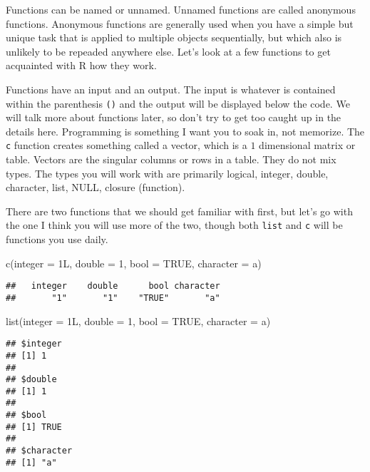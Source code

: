 \documentclass[
]{book}
\newenvironment{Shaded}{\begin{snugshade}}{\end{snugshade}}
\newcommand{\AttributeTok}[1]{\textcolor[rgb]{0.77,0.63,0.00}{#1}}
\newcommand{\ConstantTok}[1]{\textcolor[rgb]{0.00,0.00,0.00}{#1}}
\newcommand{\DecValTok}[1]{\textcolor[rgb]{0.00,0.00,0.81}{#1}}
\newcommand{\FunctionTok}[1]{\textcolor[rgb]{0.00,0.00,0.00}{#1}}
\newcommand{\NormalTok}[1]{#1}
\newcommand{\StringTok}[1]{\textcolor[rgb]{0.31,0.60,0.02}{#1}}
\begin{document}
Functions can be named or unnamed. Unnamed functions are called anonymous functions. Anonymous functions are generally used when you have a simple but unique task that is applied to multiple objects sequentially, but which also is unlikely to be repeaded anywhere else. Let's look at a few functions to get acquainted with R how they work.

Functions have an input and an output. The input is whatever is contained within the parenthesis \texttt{()} and the output will be displayed below the code. We will talk more about functions later, so don't try to get too caught up in the details here. Programming is something I want you to soak in, not memorize. The \texttt{c} function creates something called a vector, which is a \(1\) dimensional matrix or table. Vectors are the singular columns or rows in a table. They do not mix types. The types you will work with are primarily logical, integer, double, character, list, NULL, closure (function).

There are two functions that we should get familiar with first, but let's go with the one I think you will use more of the two, though both \texttt{list} and \texttt{c} will be functions you use daily.

\begin{Shaded}
\begin{Highlighting}[]
\FunctionTok{c}\NormalTok{(}\AttributeTok{integer =}\NormalTok{ 1L, }\AttributeTok{double =} \DecValTok{1}\NormalTok{, }\AttributeTok{bool =} \ConstantTok{TRUE}\NormalTok{, }\AttributeTok{character =} \StringTok{\textquotesingle{}a\textquotesingle{}}\NormalTok{)}
\end{Highlighting}
\end{Shaded}

\begin{verbatim}
##   integer    double      bool character 
##       "1"       "1"    "TRUE"       "a"
\end{verbatim}

\begin{Shaded}
\begin{Highlighting}[]
\FunctionTok{list}\NormalTok{(}\AttributeTok{integer =}\NormalTok{ 1L, }\AttributeTok{double =} \DecValTok{1}\NormalTok{, }\AttributeTok{bool =} \ConstantTok{TRUE}\NormalTok{, }\AttributeTok{character =} \StringTok{\textquotesingle{}a\textquotesingle{}}\NormalTok{)}
\end{Highlighting}
\end{Shaded}

\begin{verbatim}
## $integer
## [1] 1
## 
## $double
## [1] 1
## 
## $bool
## [1] TRUE
## 
## $character
## [1] "a"
\end{verbatim}
\end{document}
